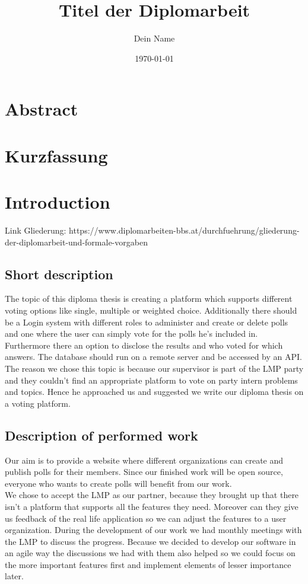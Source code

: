 \documentclass[a4paper,12pt]{report}
\begin{document}
\title{Titel der Diplomarbeit}
\author{Dein Name}
\date{\today}
\maketitle

\chapter*{Abstract}
\lipsum[1]
\newpage

\chapter*{Kurzfassung}
\lipsum[1]
\newpage

\tableofcontents
\newpage

\chapter{Introduction}
Link Gliederung: https://www.diplomarbeiten-bbs.at/durchfuehrung/gliederung-der-diplomarbeit-und-formale-vorgaben
\section{Short description}

The topic of this diploma thesis is creating a platform which supports different voting options like single, multiple or weighted choice. Additionally there should be a Login system with different roles to administer and create or delete polls and one where the user can simply vote for the polls he's included in. Furthermore there an option to disclose the results and who voted for which answers. The database should run on a remote server and be accessed by an API. \\
The reason we chose this topic is because our supervisor is part of the LMP party and they couldn't find an appropriate platform to vote on party intern problems and topics. Hence he approached us and suggested we write our diploma thesis on a voting platform.

\section{Description of performed work}
Our aim is to provide a website where different organizations can create and publish polls for their members. Since our finished work will be open source, everyone who wants to create polls will benefit from our work. \\
We chose to accept the LMP as our partner, because they brought up that there isn't a platform that supports all the features they need. Moreover can they give us feedback of the real life application so we can adjust the features to a user organization. During the development of our work we had monthly meetings with the LMP to discuss the progress. Because we decided to develop our software in an agile way the discussions we had with them also helped so we could focus on the more important features first and implement elements of lesser importance later.  
\end{document}
